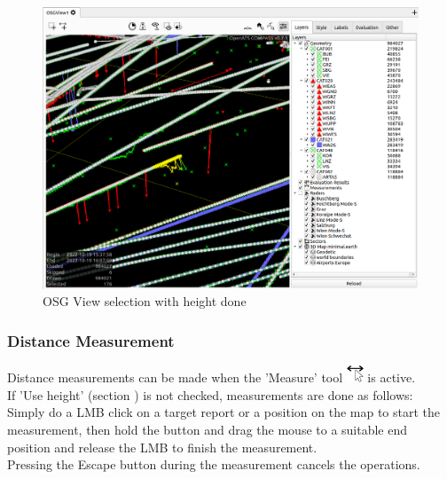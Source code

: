 \begin{figure}[H]
    \hspace*{-2.5cm}
    \includegraphics[width=19cm,frame]{figures/osgview_select3d_2.png}
  \caption{OSG View selection with height done}
\end{figure}


\subsubsection{Distance Measurement}

Distance measurements can be made when the 'Measure' tool \includegraphics[width=0.5cm,frame]{../../data/icons/measure_action.png} is active. \\

If 'Use height' (section ) is not checked, measurements are done as follows: Simply do a LMB click on a target report or a position on the map to start the measurement, then hold the button and drag the mouse to a suitable end position and release the LMB to finish the measurement. \\

Pressing the Escape button during the measurement cancels the operations.

